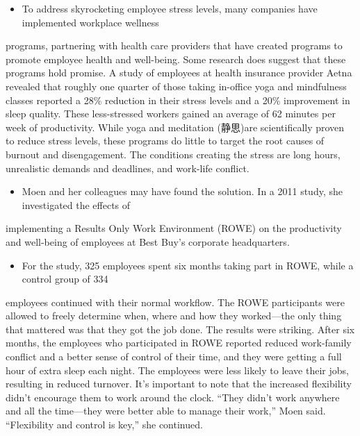 \documentclass[UTF8,11pt]{ctexart}
\begin{document}
\begin{itemize}[leftmargin=2em,itemsep=.2em,topsep=.4em]\item[K.] To address skyrocketing employee stress levels, many companies have implemented workplace wellness
\end{itemize}

programs, partnering with health care providers that have created programs to promote employee health and well-being. Some research does suggest that these programs hold promise. A study of employees at health insurance provider Aetna revealed that roughly one quarter of those taking in-office yoga and mindfulness classes reported a 28\% reduction in their stress levels and a 20\% improvement in sleep quality. These less-stressed workers gained an average of 62 minutes per week of productivity. While yoga and meditation (静思)are scientifically proven to reduce stress levels, these programs do little to target the root causes of burnout and disengagement. The conditions creating the stress are long hours, unrealistic demands and deadlines, and work-life conflict.


\begin{itemize}[leftmargin=2em,itemsep=.2em,topsep=.4em]\item[L.] Moen and her colleagues may have found the solution. In a 2011 study, she investigated the effects of
\end{itemize}

implementing a Results Only Work Environment (ROWE) on the productivity and well-being of employees at Best Buy’s corporate headquarters.


\begin{itemize}[leftmargin=2em,itemsep=.2em,topsep=.4em]\item[M.] For the study, 325 employees spent six months taking part in ROWE, while a control group of 334
\end{itemize}

employees continued with their normal workflow. The ROWE participants were allowed to freely determine when, where and how they worked---the only thing that mattered was that they got the job done. The results were striking. After six months, the employees who participated in ROWE reported reduced work-family conflict and a better sense of control of their time, and they were getting a full hour of extra sleep each night. The employees were less likely to leave their jobs, resulting in reduced turnover. It’s important to note that the increased flexibility didn’t encourage them to work around the clock. “They didn’t work anywhere and all the time---they were better able to manage their work,” Moen said. “Flexibility and control is key,” she continued.
\end{document}
